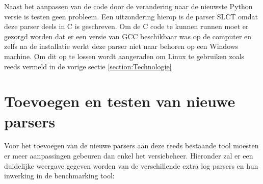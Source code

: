 Naast het aanpassen van de code door de verandering naar de nieuwste Python versie is testen geen probleem. Een uitzondering hierop is de parser SLCT omdat deze parser deels in C is geschreven. Om de C code te kunnen runnen moet er gezorgd worden dat er een versie van GCC beschikbaar was op de computer en zelfs na de installatie werkt deze parser niet naar behoren op een Windows machine. Om dit op te lossen wordt aangeraden om Linux te gebruiken zoals reeds vermeld in de vorige sectie \ref{section:Technologie}\\

\section{Toevoegen en testen van nieuwe parsers}
Voor het toevoegen van de nieuwe parsers aan deze reeds bestaande tool moesten er meer aanpassingen gebeuren dan enkel het versiebeheer. Hieronder zal er een duidelijke weergave gegeven worden van de verschillende extra log parsers en hun inwerking in de benchmarking tool:
